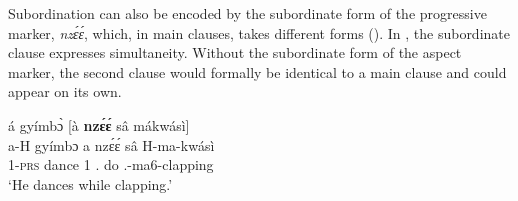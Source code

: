 Subordination can also be encoded by the subordinate form of the progressive marker, {\itshape nzɛ́ɛ́}, which, in main clauses, takes different forms (). In , the subordinate clause expresses simultaneity. Without the subordinate form of the aspect marker, the second clause would formally be identical to a main clause and could appear on its own.


\ea\label{frame1}
  \glll  á gyímbɔ̀ [à {\bfseries nzɛ́ɛ́} sâ mákwásì] \\
        a-H gyímbɔ {\db}a nzɛ́ɛ́ sâ H-ma-kwásì \\
            1-\textsc{prs} dance {\db}1 {\PROG}.{\SUB} do {\OBJ}.{\LINK}-ma6-clapping \\
    \trans `He dances while clapping.'
\z
















